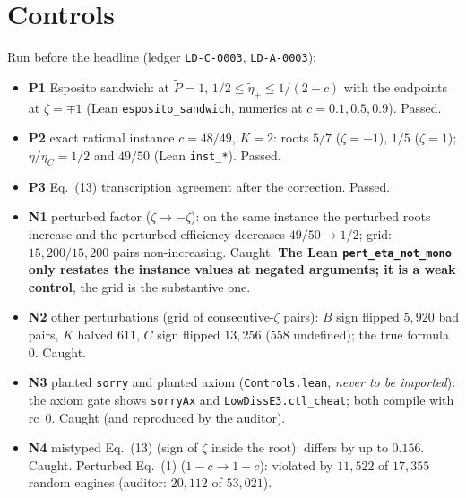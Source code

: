 \documentclass[10pt]{article}
\newcommand{\lean}[1]{\texttt{#1}}
\newcommand{\eC}{\eta_C}
\newcommand{\ep}{\tilde\eta_+}
\theoremstyle{plain}
\begin{document}
\section{Controls}\label{sec:controls}
Run before the headline (ledger \texttt{LD-C-0003}, \texttt{LD-A-0003}):
\begin{itemize}\itemsep=1pt
\item \textbf{P1} Esposito sandwich: at $\tilde P=1$, $1/2\le\ep\le1/(2-c)$ with the endpoints at $\zeta=\mp1$ (Lean \lean{esposito\_sandwich}, numerics at $c=0.1,0.5,0.9$). Passed.
\item \textbf{P2} exact rational instance $c=48/49$, $K=2$: roots $5/7$ ($\zeta=-1$), $1/5$ ($\zeta=1$); $\eta/\eC=1/2$ and $49/50$ (Lean \lean{inst\_*}). Passed.
\item \textbf{P3} Eq.~(13) transcription agreement after the correction. Passed.
\item \textbf{N1} perturbed factor ($\zeta\to-\zeta$): on the same instance the perturbed roots increase and the perturbed efficiency decreases $49/50\to1/2$; grid: $15{,}200/15{,}200$ pairs non-increasing. Caught. \textbf{The Lean \lean{pert\_eta\_not\_mono} only restates the instance values at negated arguments; it is a weak control}, the grid is the substantive one.
\item \textbf{N2} other perturbations (grid of consecutive-$\zeta$ pairs): $B$ sign flipped $5{,}920$ bad pairs, $K$ halved $611$, $C$ sign flipped $13{,}256$ ($558$ undefined); the true formula $0$. Caught.
\item \textbf{N3} planted \lean{sorry} and planted axiom (\texttt{Controls.lean}, \emph{never to be imported}): the axiom gate shows \lean{sorryAx} and \lean{LowDissE3.ctl\_cheat}; both compile with rc~0. Caught (and reproduced by the auditor).
\item \textbf{N4} mistyped Eq.~(13) (sign of $\zeta$ inside the root): differs by up to $0.156$. Caught. Perturbed Eq.~(1) ($1-c\to1+c$): violated by $11{,}522$ of $17{,}355$ random engines (auditor: $20{,}112$ of $53{,}021$).
\end{itemize}
\end{document}
